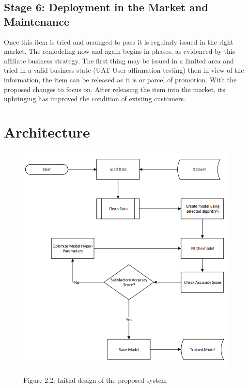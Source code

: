 \documentclass[oneside,12pt]{Classes/VTU}
\begin{document}
    	\subsection{Stage 6: Deployment in the Market and Maintenance}
    	 Once this item is tried and arranged to pass it is regularly issued in the right market. The remodeling now and again begins in phases, as evidenced by this affiliate business strategy. The first thing may be issued in a limited area and tried in a valid business state (UAT-User affirmation testing) then in view of the information, the item can be released as it is or parcel of promotion. With the proposed changes to focus on. After releasing the item into the market, its upbringing has improved the condition of existing customers.
    	
    	\section{Architecture}
    	
    	\begin{figure}
    		\begin{center}
    			\includegraphics[]{images/df.png}
    		\end{center}
    		
    		\begin{center}
				Figure 2.2: Initial design of the proposed system
    		\end{center}
    	\end{figure}
    	
\end{document}
